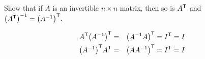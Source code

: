 
\begin{Exercise}[
name={},
title={}, 
difficulty=0,
origin={\cite{KK}}]
Show that if $A$ is an invertible $n\times n$ matrix, then so is 
${{A}^{\mathsf{T}}}$ and $\left({{A}^{\mathsf{T}}}\right) ^{-1}={{\left( A^{-1}\right)}^{\mathsf{T}}}.$ 
\end{Exercise}

\begin{Answer}
\begin{eqnarray*}
{{A}^{\mathsf{T}}}{{\left( A^{-1}\right)}^{\mathsf{T}}} &=&{{\left( A^{-1}A\right)}^{\mathsf{T}}}={{I}^{\mathsf{T}}}=I \\
{{\left( A^{-1}\right)}^{\mathsf{T}}}{{A}^{\mathsf{T}}} &=&{{\left( AA^{-1}\right)}^{\mathsf{T}}}={{I}^{\mathsf{T}}}=I
\end{eqnarray*}

\end{Answer}
